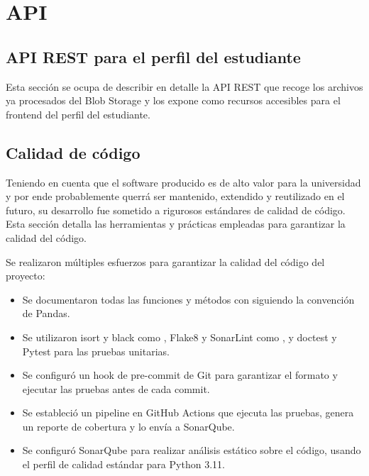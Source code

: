 \chapter{API}

\section{API REST para el perfil del estudiante}


Esta sección se ocupa de describir en detalle la \gls{API REST} que recoge los archivos ya procesados del Blob Storage y los expone como recursos accesibles para el frontend del perfil del estudiante.


\section{Calidad de código}


Teniendo en cuenta que el software producido es de alto valor para la universidad y por ende probablemente querrá ser mantenido, extendido y reutilizado en el futuro, su desarrollo fue sometido a rigurosos estándares de calidad de código. Esta sección detalla las herramientas y prácticas empleadas para garantizar la calidad del código.

\begin{resumen}
  Se realizaron múltiples esfuerzos para garantizar la calidad del código del proyecto:
  \begin{itemize}
    \item Se documentaron todas las funciones y métodos con  siguiendo la convención de \gls{Pandas}.
    \item Se utilizaron \gls{isort} y \gls{black} como , \gls{Flake8} y \gls{SonarLint} como , y \gls{doctest} y \gls{Pytest} para las \gls{pruebas unitarias}.
    \item Se configuró un \gls{hook} de pre-commit de \gls{Git} para garantizar el formato y ejecutar las pruebas antes de cada commit.
    \item Se estableció un \gls{pipeline} en \gls{GitHub Actions} que ejecuta las pruebas, genera un reporte de cobertura y lo envía a \gls{SonarQube}.
    \item Se configuró \gls{SonarQube} para realizar análisis estático sobre el código, usando el \gls{perfil de calidad} estándar para \gls{Python} 3.11.
  \end{itemize}
\end{resumen}

